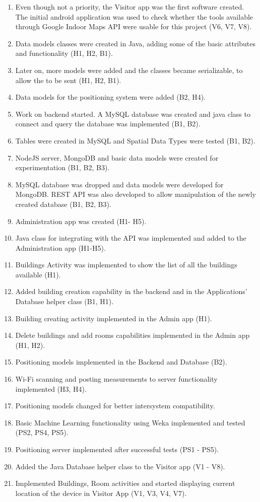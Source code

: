 \begin{enumerate}
	\item Even though not a priority, the Visitor app was the first software created. The initial android application was used to check whether the tools available through Google Indoor Maps API were usable for this project (V6, V7, V8).
	\item Data models classes were created in Java, adding some of the basic attributes and functionality (H1, H2, B1).
	\item Later on, more models were added and the classes became serializable, to allow the to be sent (H1, H2, B1).
	\item Data models for the positioning system were added (B2, H4).
	\item Work on backend started. A MySQL database was created and java class to connect and query the database was implemented (B1, B2).
	\item Tables were created in MySQL and Spatial Data Types were tested (B1, B2).
	\item NodeJS server, MongoDB and basic data models were created for experimentation (B1, B2, B3).
	\item MySQL database was dropped and data models were developed for MongoDB. REST API was also developed to allow manipulation of the newly created database (B1, B2, B3).
	\item  Administration app was created (H1- H5).
	\item Java class for integrating with the API was implemented and added to the Administration app (H1-H5).
	\item Buildings Activity was implemented to show the list of all the buildings available (H1).
	\item Added building creation capability in the backend and in the Applications’ Database helper class (B1, H1).
	\item Building creating activity implemented in the Admin app (H1).
	\item Delete buildings and add rooms capabilities implemented in the Admin app (H1, H2).
	\item Positioning models implemented in the Backend and Database (B2).
	\item Wi-Fi scanning and posting measurements to server functionality implemented (H3, H4). 
	\item Positioning models changed for better intersystem compatibility.
	\item Basic Machine Learning functionality using Weka implemented and tested (PS2, PS4, PS5).
	\item Positioning server implemented after successful tests (PS1 - PS5).
	\item Added the Java Database helper class to the Visitor app (V1 - V8).
	\item Implemented Buildings, Room activities and started displaying current location of the device in Visitor App (V1, V3, V4, V7).	
\end{enumerate}
